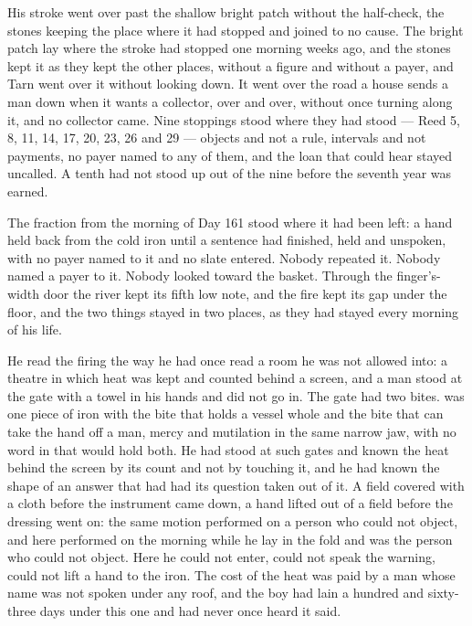 His stroke went over  past the shallow bright patch without the half-check, the stones keeping the place where it had stopped and joined to no cause. The bright patch lay where the stroke had stopped one morning weeks ago, and the stones kept it as they kept the other places, without a figure and without a payer, and Tarn went over it without looking down. It went over the road a house sends a man down when it wants a collector, over and over, without once turning along it, and no collector came. Nine stoppings stood where they had stood --- Reed 5, 8, 11, 14, 17, 20, 23, 26 and 29 --- objects and not a rule, intervals and not payments, no payer named to any of them, and the loan that could hear stayed uncalled. A tenth had not stood up out of the nine before the seventh year was earned.

The fraction from the morning of Day 161 stood where it had been left: a hand held back from the cold iron until a sentence had finished, held and unspoken, with no payer named to it and no slate entered. Nobody repeated it. Nobody named a payer to it. Nobody looked toward the basket. Through the finger's-width door the river kept its fifth low note, and the fire kept its gap under the floor, and the two things stayed in two places, as they had stayed every morning of his life.

\scenebreak

He read the firing the way he had once read a room he was not allowed into: a theatre in which heat was kept and counted behind a screen, and a man stood at the gate with a towel in his hands and did not go in. The gate had two bites.  was one piece of iron with the bite that holds a vessel whole and the bite that can take the hand off a man, mercy and mutilation in the same narrow jaw, with no word in  that would hold both. He had stood at such gates and known the heat behind the screen by its count and not by touching it, and he had known the shape of an answer that had had its question taken out of it. A field covered with a cloth before the instrument came down, a hand lifted out of a field before the dressing went on: the same motion performed on a person who could not object, and here performed on the morning while he lay in the fold and was the person who could not object. Here he could not enter, could not speak the warning, could not lift a hand to the iron. The cost of the heat was paid by a man whose name was not spoken under any roof, and the boy had lain a hundred and sixty-three days under this one and had never once heard it said.

